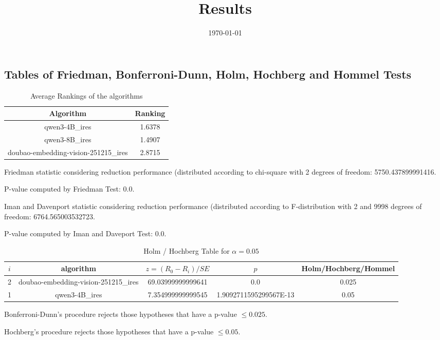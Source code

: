 \documentclass[a4paper,10pt]{article}
\title{Results}
\date{\today}
\begin{document}
\begin{landscape}
\oddsidemargin 0in \topmargin 0in\maketitle
\section{Tables of Friedman, Bonferroni-Dunn, Holm, Hochberg and Hommel Tests}
\begin{table}[!htp]
\centering
\caption{Average Rankings of the algorithms
}\begin{tabular}{c|c}
Algorithm&Ranking\\
\hline
qwen3-4B_ires&1.6378\\
qwen3-8B_ires&1.4907\\
doubao-embedding-vision-251215_ires&2.8715\\
\end{tabular}
\end{table}


Friedman statistic considering reduction performance (distributed according to chi-square with 2 degrees of freedom: 5750.437899991416.


P-value computed by Friedman Test: 0.0.\newline

Iman and Davenport statistic considering reduction performance (distributed according to F-distribution with 2 and 9998 degrees of freedom: 6764.565003532723.


P-value computed by Iman and Daveport Test: 0.0.\newline

\begin{table}[!htp]
\centering\tiny
\caption{Holm / Hochberg Table for $\alpha=0.05$}
\begin{tabular}{ccccc}
$i$&algorithm&$z=(R_0 - R_i)/SE$&$p$&Holm/Hochberg/Hommel\\
\hline
2&doubao-embedding-vision-251215_ires&69.03999999999641&0.0&0.025\\
1&qwen3-4B_ires&7.354999999999545&1.9092711595299567E-13&0.05\\
\hline
\end{tabular}
\end{table}
Bonferroni-Dunn's procedure rejects those hypotheses that have a p-value $\le0.025$.


Hochberg's procedure rejects those hypotheses that have a p-value $\le0.05$.



\end{landscape}
\end{document}
